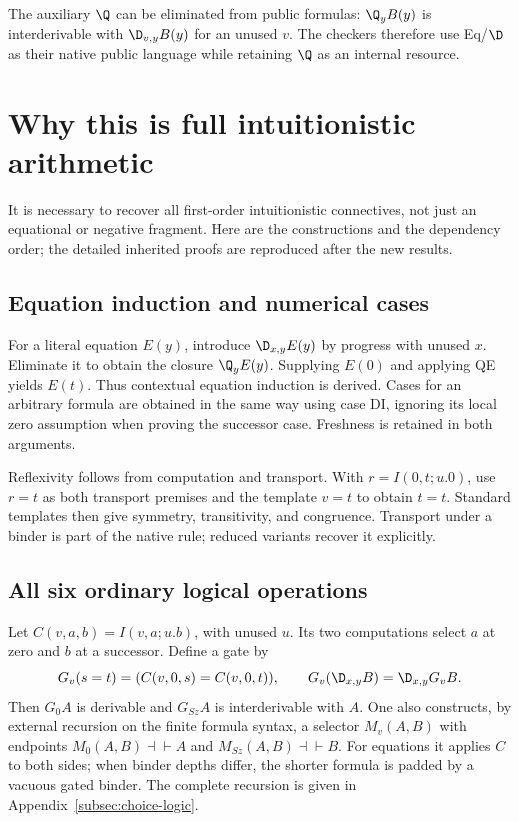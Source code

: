 The auxiliary $\Q$ can be eliminated from public formulas: $\Q_yB(y)$ is
interderivable with $\D_{v,y}B(y)$ for an unused $v$. The checkers therefore
use Eq/$\D$ as their native public language while retaining $\Q$ as an
internal resource.

\section{Why this is full intuitionistic arithmetic}
\label{sec:main-bridge}

It is necessary to recover all first-order intuitionistic connectives,
not just an equational or negative fragment. Here are the constructions
and the dependency order; the detailed inherited proofs are reproduced
after the new results.

\subsection{Equation induction and numerical cases}

For a literal equation $E(y)$, introduce $\D_{x,y}E(y)$ by progress with
unused $x$. Eliminate it to obtain the closure $\Q_yE(y)$. Supplying
$E(0)$ and applying QE yields $E(t)$. Thus contextual equation induction is
derived. Cases for an arbitrary formula are obtained in the same way
using case DI, ignoring its local zero assumption when proving the
successor case. Freshness is retained in both arguments.

Reflexivity follows from computation and transport. With
$r=I(0,t;u.0)$, use $r=t$ as both transport premises and the template
$v=t$ to obtain $t=t$. Standard templates then give symmetry,
transitivity, and congruence. Transport under a binder is part of the
native rule; reduced variants recover it explicitly.

\subsection{All six ordinary logical operations}

Let $C(v,a,b)=I(v,a;u.b)$, with unused $u$. Its two computations select
$a$ at zero and $b$ at a successor. Define a gate by
\[
 G_v(s=t)=(C(v,0,s)=C(v,0,t)),\qquad
 G_v(\D_{x,y}B)=\D_{x,y}G_vB.
\]
Then $G_0A$ is derivable and $G_{Sz}A$ is interderivable with $A$.
One also constructs, by external recursion on the finite formula
syntax, a selector $M_v(A,B)$ with endpoints
$M_0(A,B)\dashv\vdash A$ and $M_{Sz}(A,B)\dashv\vdash B$.
For equations it applies $C$ to both sides; when binder depths differ,
the shorter formula is padded by a vacuous gated binder. The complete
recursion is given in Appendix~\ref{subsec:choice-logic}.

